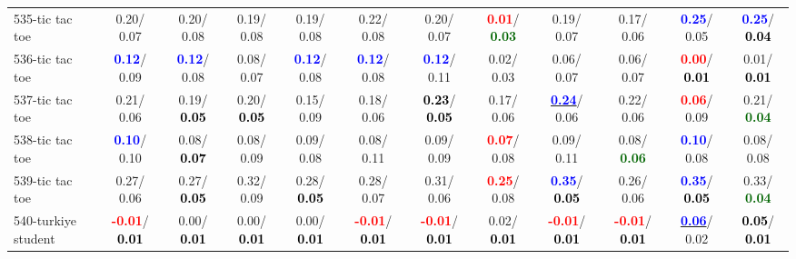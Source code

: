 \begin{table}[h]
\begin{center}
{\begin{tabular}{lc|c|c|c|c|c|c|c|c|c|c}
535-tic tac toe &   0.20/  0.07 &   0.20/  0.08 &   0.19/  0.08 &   0.19/  0.08 &   0.22/  0.08 &   0.20/  0.07 & \textcolor{red}{\textbf{  0.01}}/\textcolor{darkgreen}{\textbf{  0.03}} &   0.19/  0.07 &   0.17/  0.06 & \textcolor{blue}{\textbf{  0.25}}/  0.05 & \textcolor{blue}{\textbf{  0.25}}/\textcolor{black}{\textbf{  0.04}} \\
536-tic tac toe & \textcolor{blue}{\textbf{  0.12}}/  0.09 & \textcolor{blue}{\textbf{  0.12}}/  0.08 &   0.08/  0.07 & \textcolor{blue}{\textbf{  0.12}}/  0.08 & \textcolor{blue}{\textbf{  0.12}}/  0.08 & \textcolor{blue}{\textbf{  0.12}}/  0.11 &   0.02/  0.03 &   0.06/  0.07 &   0.06/  0.07 & \textcolor{red}{\textbf{  0.00}}/\textcolor{black}{\textbf{  0.01}} &   0.01/\textcolor{black}{\textbf{  0.01}} \\
537-tic tac toe &   0.21/  0.06 &   0.19/\textcolor{black}{\textbf{  0.05}} &   0.20/\textcolor{black}{\textbf{  0.05}} &   0.15/  0.09 &   0.18/  0.06 & \textcolor{black}{\textbf{  0.23}}/\textcolor{black}{\textbf{  0.05}} &   0.17/  0.06 & \underline{\textcolor{blue}{\textbf{  0.24}}}/  0.06 &   0.22/  0.06 & \textcolor{red}{\textbf{  0.06}}/  0.09 &   0.21/\textcolor{darkgreen}{\textbf{  0.04}} \\
538-tic tac toe & \textcolor{blue}{\textbf{  0.10}}/  0.10 &   0.08/\textcolor{black}{\textbf{  0.07}} &   0.08/  0.09 &   0.09/  0.08 &   0.08/  0.11 &   0.09/  0.09 & \textcolor{red}{\textbf{  0.07}}/  0.08 &   0.09/  0.11 &   0.08/\textcolor{darkgreen}{\textbf{  0.06}} & \textcolor{blue}{\textbf{  0.10}}/  0.08 &   0.08/  0.08 \\
539-tic tac toe &   0.27/  0.06 &   0.27/\textcolor{black}{\textbf{  0.05}} &   0.32/  0.09 &   0.28/\textcolor{black}{\textbf{  0.05}} &   0.28/  0.07 &   0.31/  0.06 & \textcolor{red}{\textbf{  0.25}}/  0.08 & \textcolor{blue}{\textbf{  0.35}}/\textcolor{black}{\textbf{  0.05}} &   0.26/  0.06 & \textcolor{blue}{\textbf{  0.35}}/\textcolor{black}{\textbf{  0.05}} &   0.33/\textcolor{darkgreen}{\textbf{  0.04}} \\
540-turkiye student & \textcolor{red}{\textbf{ -0.01}}/\textcolor{black}{\textbf{  0.01}} &   0.00/\textcolor{black}{\textbf{  0.01}} &   0.00/\textcolor{black}{\textbf{  0.01}} &   0.00/\textcolor{black}{\textbf{  0.01}} & \textcolor{red}{\textbf{ -0.01}}/\textcolor{black}{\textbf{  0.01}} & \textcolor{red}{\textbf{ -0.01}}/\textcolor{black}{\textbf{  0.01}} &   0.02/\textcolor{black}{\textbf{  0.01}} & \textcolor{red}{\textbf{ -0.01}}/\textcolor{black}{\textbf{  0.01}} & \textcolor{red}{\textbf{ -0.01}}/\textcolor{black}{\textbf{  0.01}} & \underline{\textcolor{blue}{\textbf{  0.06}}}/  0.02 & \textcolor{black}{\textbf{  0.05}}/\textcolor{black}{\textbf{  0.01}} \\ \hline

\end{tabular}}
\end{center}
\end{table}

